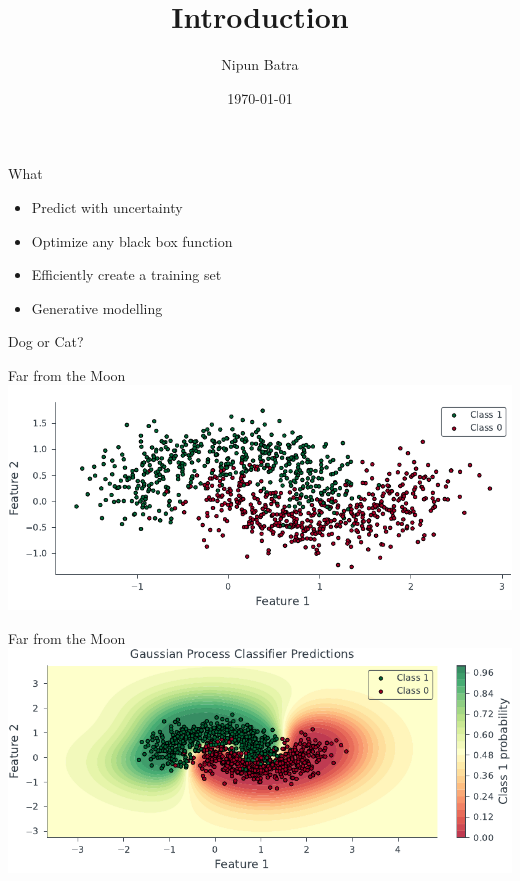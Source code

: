 \documentclass[handout]{beamer}
\begin{document}
\title{Introduction}
\author{Nipun Batra}
\date{\today}
\maketitle

\begin{frame}{What}
    \begin{itemize}
        \item Predict with uncertainty
        \item Optimize any black box function
        \item Efficiently create a training set
        \item Generative modelling
    \end{itemize}

    
\end{frame}

\begin{frame}{Dog or Cat?}  
    
\end{frame}

\begin{frame}{Far from the Moon}
    \includegraphics[width=\textwidth]{../figures/introduction/gp_classification_data.pdf}    

    
\end{frame}

\begin{frame}{Far from the Moon}
    \includegraphics[width=\textwidth]{../figures/introduction/gp_classification-3.pdf}    

    
\end{frame}
\end{document}

